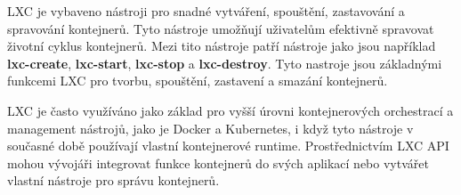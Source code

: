      LXC je vybaveno nástroji pro snadné vytváření, spouštění, zastavování a spravování kontejnerů. Tyto nástroje umožňují uživatelům efektivně spravovat životní cyklus kontejnerů. Mezi tito nástroje patří nástroje jako jsou například \textbf{lxc-create}, \textbf{lxc-start}, \textbf{lxc-stop} a \textbf{lxc-destroy}. Tyto nastroje jsou základnými funkcemi LXC pro tvorbu, spouštění, zastavení a smazání kontejnerů.


     LXC je často využíváno jako základ pro vyšší úrovni kontejnerových orchestrací a management nástrojů, jako je Docker a Kubernetes, i když tyto nástroje v současné době používají vlastní kontejnerové runtime. Prostřednictvím LXC API mohou vývojáři integrovat funkce kontejnerů do svých aplikací nebo vytvářet vlastní nástroje pro správu kontejnerů.

